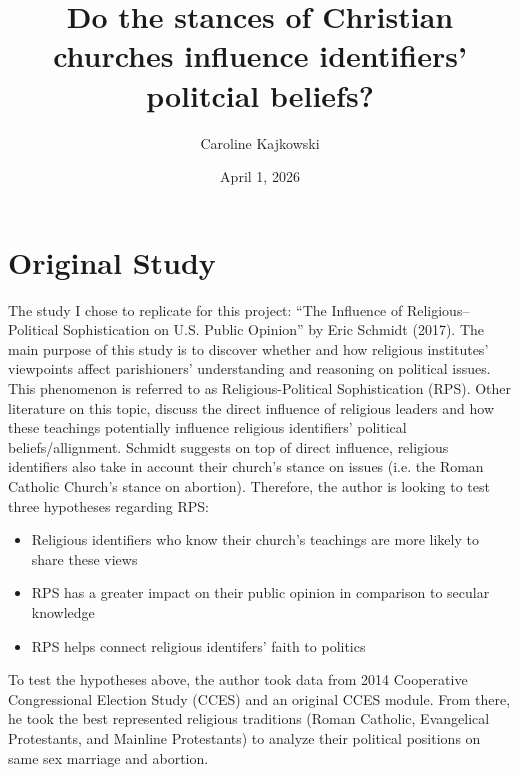 \documentclass[12pt,letterpaper]{article}
\title{Do the stances of Christian churches influence identifiers' politcial beliefs? }
\date{April 1, 2026}
\author{Caroline Kajkowski}
\begin{document}
	\maketitle
\section{Original Study}
\begin{description}
	\item The study I chose to replicate for this project: “The Influence of Religious–Political Sophistication on U.S. Public Opinion” by Eric Schmidt (2017). The main purpose of this study is to discover whether and how religious institutes’ viewpoints affect parishioners' understanding and reasoning on political issues. This phenomenon is referred to as Religious-Political Sophistication (RPS). 
	Other literature on this topic, discuss the direct influence of religious leaders and how these teachings potentially influence religious identifiers' political beliefs/allignment. Schmidt suggests on top of direct influence, religious identifiers also take in account their church's stance on issues (i.e. the Roman Catholic Church's stance on abortion). 
	Therefore, the author is looking to test three hypotheses regarding RPS: 
	\begin{itemize}
		\item Religious identifiers who know their church’s teachings are more likely to share these views
		\item RPS has a greater impact on their public opinion in comparison to secular knowledge
		\item RPS helps connect religious identifers' faith to politics
	\end{itemize}
	\item[Method]
	\item To test the hypotheses above, the author took data from 2014 Cooperative Congressional Election Study (CCES) and an original CCES module. From there, he took the best represented religious traditions (Roman Catholic, Evangelical Protestants, and Mainline Protestants) to analyze their political positions on same sex marriage and abortion. 
\end{description}
\newpage
\end{document}

